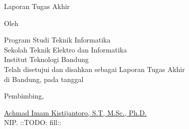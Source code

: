 \clearpage
\pagestyle{empty}

\begin{center}
  \smallskip
  
  \Large \bfseries \MakeUppercase{\thetitle}
  \vfill
  
  \Large Laporan Tugas Akhir
  \vfill
  
  \large Oleh
  
  \Large \theauthor
  
  \large Program Studi Teknik Informatika \\
  
  \normalsize \normalfont
  Sekolah Teknik Elektro dan Informatika \\
  Institut Teknologi Bandung \\
  
  \vfill
  \normalsize \normalfont
  Telah disetujui dan disahkan sebagai Laporan Tugas Akhir \\
  di Bandung, pada tanggal \tanggalpengesahan
  
  \vspace{0.5cm}
  Pembimbing,
  
  \vfill
  \underline{Achmad Imam Kistijantoro, S.T, M.Sc., Ph.D.
  } \\
  NIP. ::TODO: fill::
  
\end{center}
\clearpage
